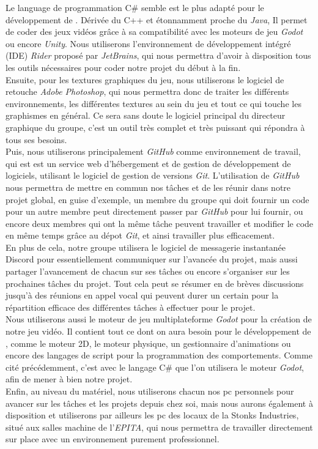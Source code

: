 Le language de programmation C\# semble est le plus adapté pour le développement de \textit{\gameName}. 
Dérivée du C++ et étonnamment proche du \textit{Java}, Il permet de coder des jeux vidéos grâce à sa compatibilité avec les moteurs de jeu \textit{Godot} ou encore \textit{Unity}.
Nous utiliserons l’environnement de développement intégré (IDE) \textit{Rider} proposé par \textit{JetBrains}, qui  nous permettra d’avoir à disposition tous les outils nécessaires pour coder notre projet du début à la fin.
\\

Ensuite, pour les textures graphiques du jeu, nous utiliserons le logiciel de retouche \textit{Adobe Photoshop}, qui nous permettra donc de traiter les différents environnements, les différentes textures au sein du jeu et tout ce qui touche les graphismes en général.
Ce sera sans doute le logiciel principal du directeur graphique du groupe, c'est un outil très complet et très puissant qui répondra à tous ses besoins.
\\

Puis, nous utiliserons principalement \textit{GitHub} comme environnement de travail, qui est est un service web d’hébergement et de gestion de développement de logiciels, utilisant le logiciel de gestion de versions \textit{Git}. 
L’utilisation de \textit{GitHub} nous permettra de mettre en commun nos tâches et de les réunir dans notre projet global, en guise d’exemple, un membre du groupe qui doit fournir un code pour un autre membre peut directement passer par \textit{GitHub} pour lui fournir, ou encore deux membres qui ont la même tâche peuvent travailler et modifier le code en même temps grâce au dépot \textit{Git}, et ainsi travailler plus efficacement.
\\

En plus de cela, notre groupe utilisera le logiciel de messagerie instantanée Discord pour essentiellement communiquer sur l’avancée du projet, mais aussi partager l’avancement de chacun sur ses tâches ou encore s’organiser sur les prochaines tâches du projet. Tout cela peut se résumer en de brèves discussions jusqu’à des réunions en appel vocal qui peuvent durer un certain pour la répartition efficace des différentes tâches à effectuer pour le projet.
\\

Nous utiliserons aussi le moteur de jeu multiplateforme \textit{Godot} pour la création de notre jeu vidéo.
Il contient tout ce dont on aura besoin pour le développement de \textit{\gameName}, comme le moteur 2D, le moteur physique, un gestionnaire d’animations ou encore des langages de script pour la programmation des comportements. 
Comme cité précédemment, c’est avec le langage C\# que l’on utilisera le moteur \textit{Godot}, afin de mener à bien notre projet.
\\

Enfin, au niveau du matériel, nous utiliserons chacun nos pc personnels pour avancer sur les tâches et les projets depuis chez soi, mais nous aurons également à disposition et utiliserons par ailleurs les pc des locaux de la Stonks Industries, situé aux salles machine de l’\textit{EPITA}, qui nous permettra de travailler directement sur place avec un environnement purement professionnel.
\\
